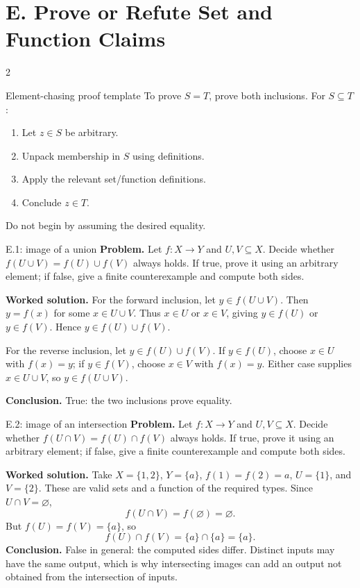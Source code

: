\documentclass[10pt]{article}
\begin{document}
\bigskip
\section*{E. Prove or Refute Set and Function Claims}
\begin{multicols}{2}
\begin{methodbox}{Element-chasing proof template}
To prove $S=T$, prove both inclusions. For $S\subseteq T$:
\begin{enumerate}
\item Let $z\in S$ be arbitrary.
\item Unpack membership in $S$ using definitions.
\item Apply the relevant set/function definitions.
\item Conclude $z\in T$.
\end{enumerate}
Do not begin by assuming the desired equality.
\end{methodbox}

\begin{workedbox}{E.1: image of a union}
\textbf{Problem.} Let $f:X\to Y$ and $U,V\subseteq X$. Decide whether
$f(U\cup V)=f(U)\cup f(V)$ always holds. If true, prove it using an arbitrary
element; if false, give a finite counterexample and compute both sides.

\textbf{Worked solution.} For the forward inclusion, let $y\in f(U\cup V)$.
Then $y=f(x)$ for some $x\in U\cup V$. Thus $x\in U$ or $x\in V$, giving
$y\in f(U)$ or $y\in f(V)$. Hence $y\in f(U)\cup f(V)$.

For the reverse inclusion, let $y\in f(U)\cup f(V)$. If $y\in f(U)$,
choose $x\in U$ with $f(x)=y$; if $y\in f(V)$, choose $x\in V$ with
$f(x)=y$. Either case supplies $x\in U\cup V$, so $y\in f(U\cup V)$.

\textbf{Conclusion.} True: the two inclusions prove equality.
\end{workedbox}

\begin{workedbox}{E.2: image of an intersection}
\textbf{Problem.} Let $f:X\to Y$ and $U,V\subseteq X$. Decide whether
$f(U\cap V)=f(U)\cap f(V)$ always holds. If true, prove it using an arbitrary
element; if false, give a finite counterexample and compute both sides.

\textbf{Worked solution.} Take $X=\{1,2\}$, $Y=\{a\}$,
$f(1)=f(2)=a$, $U=\{1\}$, and $V=\{2\}$. These are valid sets and a function
of the required types. Since $U\cap V=\varnothing$,
\[
f(U\cap V)=f(\varnothing)=\varnothing.
\]
But $f(U)=f(V)=\{a\}$, so
\[
f(U)\cap f(V)=\{a\}\cap\{a\}=\{a\}.
\]
\textbf{Conclusion.} False in general: the computed sides differ. Distinct
inputs may have the same output, which is why intersecting images can add an
output not obtained from the intersection of inputs.
\end{workedbox}



\end{multicols}
\end{document}
